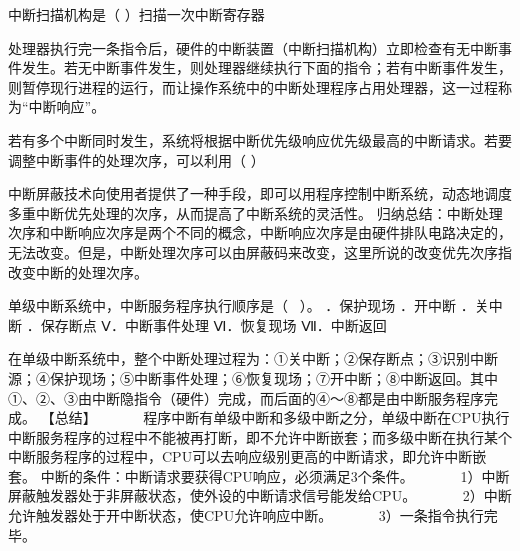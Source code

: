 \question 中断扫描机构是（ ）扫描一次中断寄存器
\par{}
\begin{solution}处理器执行完一条指令后，硬件的中断装置（中断扫描机构）立即检查有无中断事件发生。若无中断事件发生，则处理器继续执行下面的指令；若有中断事件发生，则暂停现行进程的运行，而让操作系统中的中断处理程序占用处理器，这一过程称为``中断响应''。
\end{solution}
\question 若有多个中断同时发生，系统将根据中断优先级响应优先级最高的中断请求。若要调整中断事件的处理次序，可以利用（
）
\par{}
\begin{solution}中断屏蔽技术向使用者提供了一种手段，即可以用程序控制中断系统，动态地调度多重中断优先处理的次序，从而提高了中断系统的灵活性。
归纳总结：中断处理次序和中断响应次序是两个不同的概念，中断响应次序是由硬件排队电路决定的，无法改变。但是，中断处理次序可以由屏蔽码来改变，这里所说的改变优先次序指改变中断的处理次序。
\end{solution}
\question 单级中断系统中，中断服务程序执行顺序是（ ~）。 ．保护现场 ．开中断
．关中断 ．保存断点 Ⅴ．中断事件处理 Ⅵ．恢复现场 Ⅶ．中断返回
\par{}
\begin{solution}在单级中断系统中，整个中断处理过程为：①关中断；②保存断点；③识别中断源；④保护现场；⑤中断事件处理；⑥恢复现场；⑦开中断；⑧中断返回。其中①、②、③由中断隐指令（硬件）完成，而后面的④～⑧都是由中断服务程序完成。
【总结】 ~ ~ ~
~程序中断有单级中断和多级中断之分，单级中断在CPU执行中断服务程序的过程中不能被再打断，即不允许中断嵌套；而多级中断在执行某个中断服务程序的过程中，CPU可以去响应级别更高的中断请求，即允许中断嵌套。
中断的条件：中断请求要获得CPU响应，必须满足3个条件。 ~ ~ ~
~1）中断屏蔽触发器处于非屏蔽状态，使外设的中断请求信号能发给CPU。 ~ ~ ~
~2）中断允许触发器处于开中断状态，使CPU允许响应中断。 ~ ~ ~
~3）一条指令执行完毕。
\end{solution}
